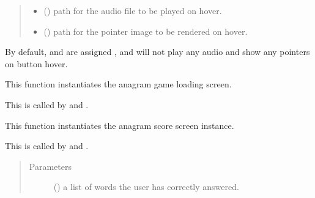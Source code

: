 \documentclass[letterpaper,10pt,english,openany,oneside]{sphinxmanual}
\begin{document}
\begin{fulllineitems}
\begin{quote}
\begin{description}
\begin{itemize}
\item {} 
 () \textendash{} path for the audio file to be played on hover.

\item {} 
 () \textendash{} path for the pointer image to be rendered on hover.

\end{itemize}

\end{description}\end{quote}

By default,  and  are assigned , and will not play any audio
and show any pointers on button hover.

\end{fulllineitems}


\begin{fulllineitems}
\label{\detokenize{index:interface.anagram_loading_screen}}
This function instantiates the anagram game loading screen.

This is called by  and .

\end{fulllineitems}


\begin{fulllineitems}
\label{\detokenize{index:interface.anagram_score_screen}}
This function instantiates the anagram score screen instance.

This is called by  and .
\begin{quote}\begin{description}
\item[{Parameters}] \leavevmode
{} () \textendash{} a list of words the user has correctly answered.

\end{description}\end{quote}

\end{fulllineitems}
\end{document}
